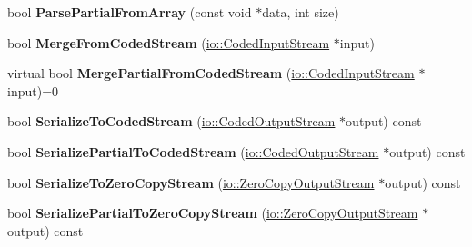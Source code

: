 \begin{DoxyCompactItemize}
\item 
\mbox{\label{classgoogle_1_1protobuf_1_1MessageLite_a8e39016649ce7df865094a6db690ee6b}} 
bool {\bfseries Parse\+Partial\+From\+Array} (const void $\ast$data, int size)
\item 
\mbox{\label{classgoogle_1_1protobuf_1_1MessageLite_a052068e820916c4ea3c0c68d7f32ea64}} 
bool {\bfseries Merge\+From\+Coded\+Stream} (\hyperlink{classgoogle_1_1protobuf_1_1io_1_1CodedInputStream}{io\+::\+Coded\+Input\+Stream} $\ast$input)
\item 
\mbox{\label{classgoogle_1_1protobuf_1_1MessageLite_a3005e1af614c3a90ff6690fa20a5d086}} 
virtual bool {\bfseries Merge\+Partial\+From\+Coded\+Stream} (\hyperlink{classgoogle_1_1protobuf_1_1io_1_1CodedInputStream}{io\+::\+Coded\+Input\+Stream} $\ast$input)=0
\item 
\mbox{\label{classgoogle_1_1protobuf_1_1MessageLite_aa7bd5831ae36fb1a8976ab583c10292c}} 
bool {\bfseries Serialize\+To\+Coded\+Stream} (\hyperlink{classgoogle_1_1protobuf_1_1io_1_1CodedOutputStream}{io\+::\+Coded\+Output\+Stream} $\ast$output) const
\item 
\mbox{\label{classgoogle_1_1protobuf_1_1MessageLite_a71ea1f767477f1f381cf9d0be7d93bda}} 
bool {\bfseries Serialize\+Partial\+To\+Coded\+Stream} (\hyperlink{classgoogle_1_1protobuf_1_1io_1_1CodedOutputStream}{io\+::\+Coded\+Output\+Stream} $\ast$output) const
\item 
\mbox{\label{classgoogle_1_1protobuf_1_1MessageLite_adc826c8b63c32aeda21a17921f30bb93}} 
bool {\bfseries Serialize\+To\+Zero\+Copy\+Stream} (\hyperlink{classgoogle_1_1protobuf_1_1io_1_1ZeroCopyOutputStream}{io\+::\+Zero\+Copy\+Output\+Stream} $\ast$output) const
\item 
\mbox{\label{classgoogle_1_1protobuf_1_1MessageLite_ac3fafe2b3f586499db6e4ee1b894c1a2}} 
bool {\bfseries Serialize\+Partial\+To\+Zero\+Copy\+Stream} (\hyperlink{classgoogle_1_1protobuf_1_1io_1_1ZeroCopyOutputStream}{io\+::\+Zero\+Copy\+Output\+Stream} $\ast$output) const

\end{DoxyCompactItemize}
